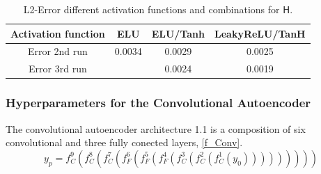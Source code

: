 \documentclass[12pt, a4paper]{article}
\newcommand{\hy}{\(\textsf{H}\)}
\begin{document}
\begin{table}[!htbp]\centering
	\begin{tabular}{ |c|c|c|c| }
		\hline
		Activation function & ELU & ELU/Tanh & LeakyReLU/TanH \\ 
		\hline
		Error 2nd run& 0.0034 & 0.0029 & 0.0025\\ \hline
		Error 3rd run& 		  & 0.0024 & 0.0019 \\ \hline
	\end{tabular}
	\caption{L2-Error different activation functions and combinations for \hy.}
	\label{Tab:Activations Rare 2nd}
\end{table}
\subsubsection{Hyperparameters for the Convolutional Autoencoder}\label{Convolutional}
The convolutional autoencoder architecture 1.1 is a composition of six convolutional and three fully conected layers, \cref{f_Conv}.
\begin{equation}
y_p = f_{C}^9(f_{C}^8(f_{C}^7(f_{F}^6(f_{F}^5(f_{F}^4(f_{C}^3(f_{C}^2(f_{C}^1(y_0)))))))))
\label{f_Conv}
\end{equation}
\end{document}
